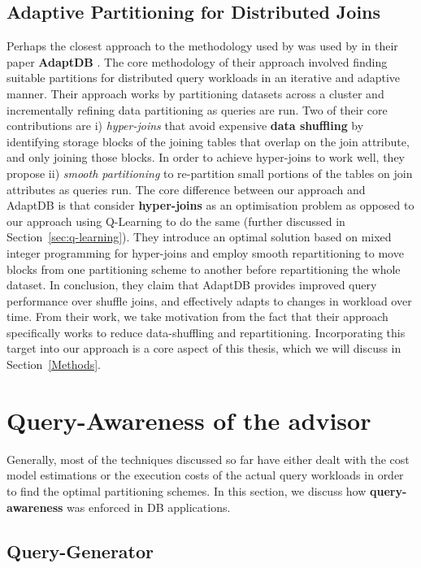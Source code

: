 \subsection{Adaptive Partitioning for Distributed Joins}
Perhaps the closest approach to the methodology used by \citeauthor{Hilprecht:2019:TLP:3329859.3329876} was used by \citeauthor{DBLP:journals/pvldb/LuSJM17} in their paper \textbf{AdaptDB} \cite{DBLP:journals/pvldb/LuSJM17}. The core methodology of their approach involved finding suitable partitions for distributed query workloads in an iterative and adaptive manner. Their approach works by partitioning datasets across a cluster and incrementally refining data partitioning as queries are run. Two of their core contributions are i) \textit{hyper-joins} that avoid expensive \textbf{data shuffling} by identifying storage blocks of the joining tables that overlap on the join attribute, and only joining those blocks. In order to achieve hyper-joins to work well, they propose ii) \textit{smooth partitioning} to re-partition small portions of the tables on join attributes as queries run. 
The core difference between our approach and AdaptDB is that \citeauthor{DBLP:journals/pvldb/LuSJM17} consider \textbf{hyper-joins} as an optimisation problem as opposed to our approach using Q-Learning to do the same (further discussed in Section~\ref{sec:q-learning}). They introduce an optimal solution based on mixed integer programming for hyper-joins and employ smooth repartitioning to move blocks from one partitioning scheme to another before repartitioning the whole dataset. In conclusion, they claim that AdaptDB provides improved query performance over shuffle joins, and effectively adapts to changes in workload over time. From their work, we take motivation from the fact that their approach specifically works to reduce data-shuffling and repartitioning. Incorporating this target into our approach is a core aspect of this thesis, which we will discuss in Section~\ref{Methods}.


\section{Query-Awareness of the advisor}
Generally, most of the techniques discussed so far have either dealt with the cost model estimations or the execution costs of the actual query workloads in order to find the optimal partitioning schemes. In this section, we discuss how \textbf{query-awareness} was enforced in DB applications. 

\subsection{Query-Generator}


